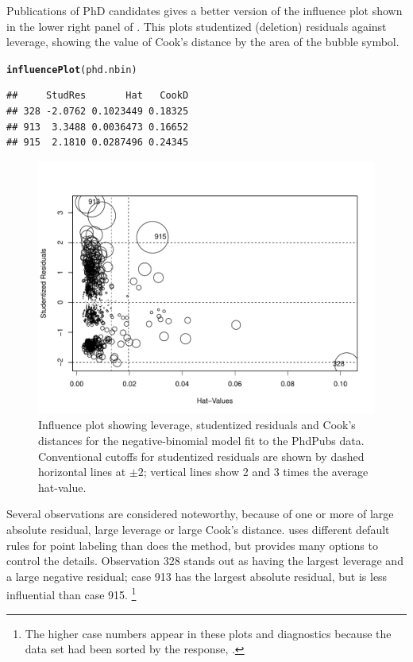 \documentclass[11pt]{book}\usepackage[]{graphicx}\usepackage[]{color}
\makeatletter
\newcommand{\hlstd}[1]{\textcolor[rgb]{0.345,0.345,0.345}{#1}}%
\newcommand{\hlkwd}[1]{\textcolor[rgb]{0.737,0.353,0.396}{\textbf{#1}}}%
\newenvironment{kframe}{%
 \def\at@end@of@kframe{}%
 \ifinner\ifhmode%
  \def\at@end@of@kframe{\end{minipage}}%
  \begin{minipage}{\columnwidth}%
 \fi\fi%
 \def\FrameCommand##1{\hskip\@totalleftmargin \hskip-\fboxsep
 \colorbox{shadecolor}{##1}\hskip-\fboxsep
     \hskip-\linewidth \hskip-\@totalleftmargin \hskip\columnwidth}%
 \MakeFramed {\advance\hsize-\width
   \@totalleftmargin\z@ \linewidth\hsize
   \@setminipage}}%
 {\par\unskip\endMakeFramed%
 \at@end@of@kframe}
\newenvironment{knitrout}{}{} %
\renewenvironment{knitrout}{\small\renewcommand{\baselinestretch}{.85}}{} %
\makeatother
\begin{document}
\begin{Example}[phdpubs5]{Publications of PhD candidates}
 gives a better version of the influence plot shown in the lower right
panel of .
This plots studentized (deletion) residuals against leverage, showing
the value of Cook's distance by the area of the bubble symbol.
\begin{knitrout}
\color{fgcolor}\begin{kframe}
\begin{alltt}
\hlkwd{influencePlot}\hlstd{(phd.nbin)}
\end{alltt}
\begin{verbatim}
##     StudRes       Hat   CookD
## 328 -2.0762 0.1023449 0.18325
## 913  3.3488 0.0036473 0.16652
## 915  2.1810 0.0287496 0.24345
\end{verbatim}
\end{kframe}\begin{figure}[!htbp]

\centerline{\includegraphics[width=.7\textwidth]{ch09/fig/phdpubs5-influenceplot-1} }

\caption[Influence plot showing leverage, studentized residuals and Cook's distances for the negative-binomial model fit to the PhdPubs data]{Influence plot showing leverage, studentized residuals and Cook's distances for the negative-binomial model fit to the PhdPubs data. Conventional cutoffs for studentized residuals are shown by dashed horizontal lines at $\pm 2$; vertical lines show 2 and 3 times the average hat-value.\label{fig:phdpubs5-influenceplot}}
\end{figure}


\end{knitrout}
Several observations are considered noteworthy, because of one or more of large absolute residual, large leverage or
large Cook's distance.  uses different default rules for point labeling than does the
 method, but provides many options to control the details.
Observation 328 stands out as having the largest leverage and a large negative residual;
case 913 has the largest absolute residual, but is less influential than case 915.%
\footnote{
The higher case numbers appear in these plots and diagnostics because the data set  had been sorted
by the response, .
}


\end{Example}
\end{document}
